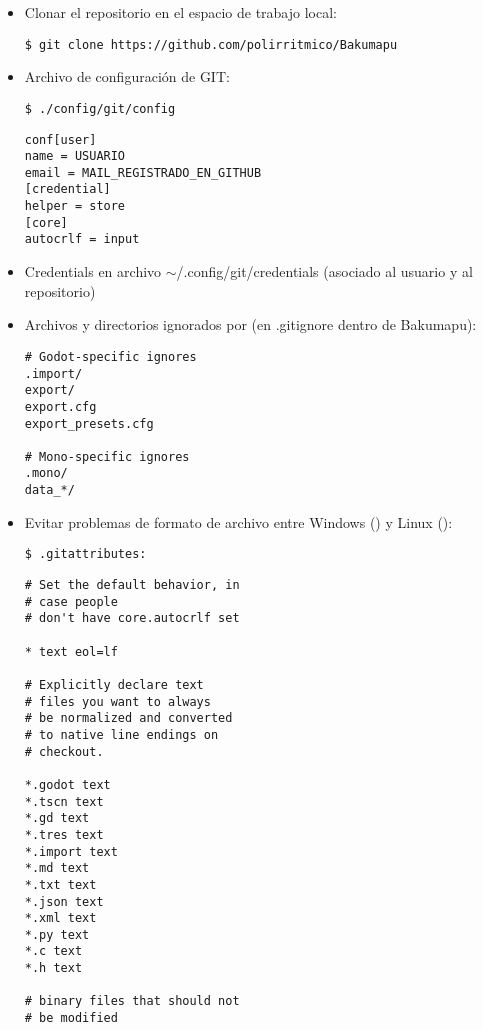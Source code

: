 \begin{itemize}[label=-]

\item Clonar el repositorio en el espacio de trabajo local:
\begin{lstlisting}
$ git clone https://github.com/polirritmico/Bakumapu
\end{lstlisting}

\item Archivo de configuración de GIT:
\begin{lstlisting}
$ ./config/git/config
\end{lstlisting}

\begin{lstlisting}
conf[user]
name = USUARIO
email = MAIL_REGISTRADO_EN_GITHUB
[credential]
helper = store
[core]
autocrlf = input
\end{lstlisting}

\item Credentials en archivo $\sim$/.config/git/credentials (asociado al usuario y al repositorio)

\item Archivos y directorios ignorados por  (en .gitignore dentro de Bakumapu):
\begin{lstlisting}
# Godot-specific ignores
.import/
export/
export.cfg
export_presets.cfg

# Mono-specific ignores
.mono/
data_*/
\end{lstlisting}


\item Evitar problemas de formato de archivo entre Windows () y Linux ():
\begin{lstlisting}
$ .gitattributes:
\end{lstlisting}
\noindent\begin{minipage}{.45\textwidth}
\begin{lstlisting}
# Set the default behavior, in
# case people
# don't have core.autocrlf set

* text eol=lf

# Explicitly declare text
# files you want to always
# be normalized and converted 
# to native line endings on
# checkout.

*.godot text
*.tscn text
*.gd text
*.tres text
*.import text
*.md text
*.txt text
*.json text
*.xml text
*.py text
*.c text
*.h text

# binary files that should not
# be modified


\end{lstlisting}
\end{minipage}
\end{itemize}
